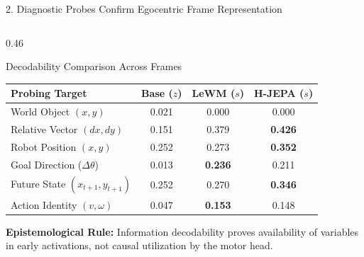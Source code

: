 \documentclass[aspectratio=169, 10pt]{beamer}
\begin{document}
\begin{frame}{2. Diagnostic Probes Confirm Egocentric Frame Representation}
\begin{columns}[T]
    \begin{column}{0.46\textwidth}
      \begin{block}{Decodability Comparison Across Frames}
        \scriptsize
        \centering
        \setlength{\tabcolsep}{3pt}
        \begin{tabular}{lccc}
          \toprule
          \textbf{Probing Target} & \textbf{Base ($z$)} & \textbf{LeWM ($s$)} & \textbf{H-JEPA ($s$)} \\
          \midrule
          World Object $(x, y)$ & 0.021 & 0.000 & \alert{0.000} \\
          Relative Vector $(dx, dy)$ & 0.151 & 0.379 & \textbf{0.426} \\
          Robot Position $(x, y)$ & 0.252 & 0.273 & \textbf{0.352} \\
          Goal Direction ($\Delta \theta$) & 0.013 & \textbf{0.236} & 0.211 \\
          Future State $(x_{t+1}, y_{t+1})$ & 0.252 & 0.270 & \textbf{0.346} \\
          Action Identity $(v, \omega)$ & 0.047 & \textbf{0.153} & 0.148 \\
          \bottomrule
        \end{tabular}
      \end{block}
      \vspace{0.05cm}
      \scriptsize \textbf{Epistemological Rule:} Information decodability proves availability of variables in early activations, not causal utilization by the motor head.
    \end{column}
  \end{columns}
\end{frame}
\end{document}
